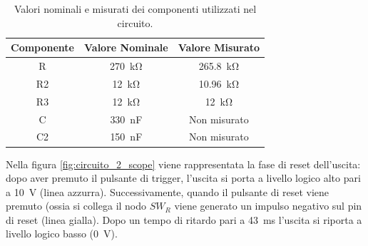 \def\arraystretch{1.3}
\begin{table}[h!]
	\centering
	\begin{tabular}{|c|c|c|}
		\hline
		Componente	& Valore Nominale & Valore Misurato \\ \hline
		R &\SI{270}{\kilo\ohm} & \SI{265,8}{\kilo\ohm} \\ \hline
		R2 &\SI{12}{\kilo\ohm} & \SI{10,96}{\kilo\ohm} \\ \hline
		R3 & \SI{12}{\kilo\ohm} & \SI{12}{\kilo\ohm} \\ \hline
		C & \SI{330}{\nano\farad} & Non misurato \\ \hline
		C2 & \SI{150}{\nano\farad} & Non misurato \\ \hline
	\end{tabular}
	\caption{Valori nominali e misurati dei componenti utilizzati nel circuito.}
	\label{tab:valori_componenti_1}
\end{table}
Nella figura \ref{fig:circuito_2_scope} viene rappresentata la fase di reset dell'uscita: dopo aver premuto il pulsante di trigger, l'uscita si porta a livello logico alto pari a \SI{10}{\volt} (linea azzurra). Successivamente, quando il pulsante di reset viene premuto (ossia si collega il nodo $SW_{R}$ viene generato un impulso negativo sul pin di reset (linea gialla). Dopo un tempo di ritardo pari a \SI{43}{\milli\second} l'uscita si riporta a livello logico basso (\SI{0}{\volt}).
